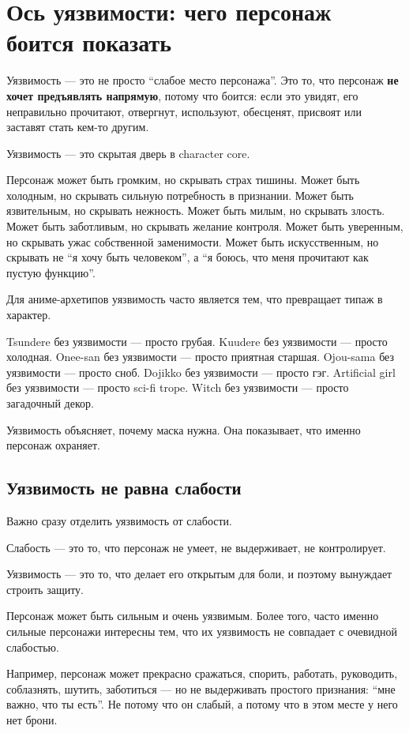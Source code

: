 \section{Ось уязвимости: чего персонаж боится показать}

Уязвимость --- это не просто ``слабое место персонажа''. Это то, что
персонаж \textbf{не хочет предъявлять напрямую}, потому что боится: если
это увидят, его неправильно прочитают, отвергнут, используют, обесценят,
присвоят или заставят стать кем-то другим.

Уязвимость --- это скрытая дверь в character core.

Персонаж может быть громким, но скрывать страх тишины. Может быть
холодным, но скрывать сильную потребность в признании. Может быть
язвительным, но скрывать нежность. Может быть милым, но скрывать злость.
Может быть заботливым, но скрывать желание контроля. Может быть
уверенным, но скрывать ужас собственной заменимости. Может быть
искусственным, но скрывать не ``я хочу быть человеком'', а ``я боюсь,
что меня прочитают как пустую функцию''.

Для аниме-архетипов уязвимость часто является тем, что превращает типаж
в характер.

Tsundere без уязвимости --- просто грубая. Kuudere без уязвимости ---
просто холодная. Onee-san без уязвимости --- просто приятная старшая.
Ojou-sama без уязвимости --- просто сноб. Dojikko без уязвимости ---
просто гэг. Artificial girl без уязвимости --- просто sci-fi trope.
Witch без уязвимости --- просто загадочный декор.

Уязвимость объясняет, почему маска нужна. Она показывает, что именно
персонаж охраняет.

\subsection*{Уязвимость не равна слабости}

Важно сразу отделить уязвимость от слабости.

Слабость --- это то, что персонаж не умеет, не выдерживает, не
контролирует.

Уязвимость --- это то, что делает его открытым для боли, и поэтому
вынуждает строить защиту.

Персонаж может быть сильным и очень уязвимым. Более того, часто именно
сильные персонажи интересны тем, что их уязвимость не совпадает с
очевидной слабостью.

Например, персонаж может прекрасно сражаться, спорить, работать,
руководить, соблазнять, шутить, заботиться --- но не выдерживать
простого признания: ``мне важно, что ты есть''. Не потому что он слабый,
а потому что в этом месте у него нет брони.

